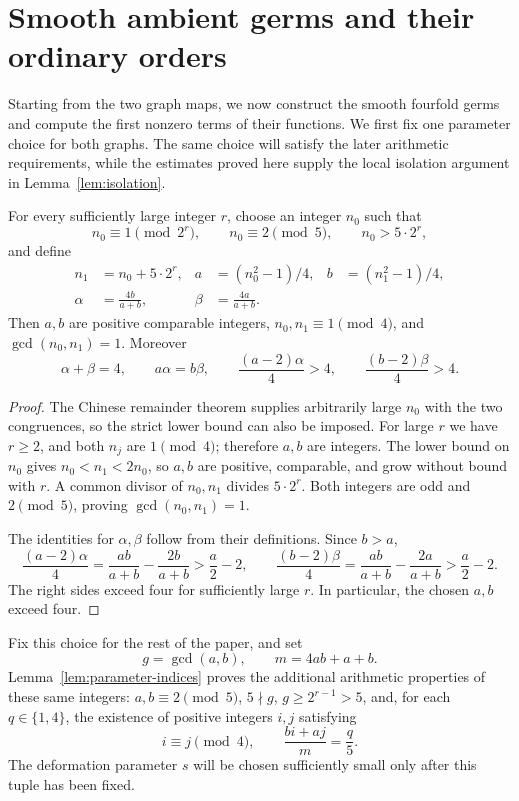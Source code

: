 \section{Smooth ambient germs and their ordinary orders}
\label{sec:ambient-germs}

Starting from the two graph maps, we now construct the smooth fourfold
germs and compute the first nonzero terms of their functions.  We first
fix one parameter choice for both graphs.  The same choice will satisfy
the later arithmetic requirements, while the estimates proved here
supply the local isolation argument in Lemma~\ref{lem:isolation}.

\begin{lemma}\label{lem:simultaneous-parameters}
For every sufficiently large integer \(r\), choose an integer \(n_0\)
such that
\[
 n_0\equiv1\pmod{2^r},\qquad n_0\equiv2\pmod5,\qquad
 n_0>5\cdot2^r,
\]
and define
\begin{align*}
 n_1&=n_0+5\cdot2^r,&
 a&=(n_0^2-1)/4,& b&=(n_1^2-1)/4,\\
 \alpha&=\frac{4b}{a+b},&
 \beta&=\frac{4a}{a+b}.
\end{align*}
Then \(a,b\) are positive comparable integers,
\(n_0,n_1\equiv1\pmod4\), and \(\gcd(n_0,n_1)=1\).
Moreover
\[
 \alpha+\beta=4,\qquad a\alpha=b\beta,\qquad
 \frac{(a-2)\alpha}{4}>4,\qquad
 \frac{(b-2)\beta}{4}>4.
\]
\end{lemma}

\begin{proof}
The Chinese remainder theorem supplies arbitrarily large \(n_0\)
with the two congruences, so the strict lower bound can also be imposed.
For large \(r\) we have \(r\ge2\), and both \(n_j\) are \(1\pmod4\);
therefore \(a,b\) are integers.  The lower bound on \(n_0\) gives
\(n_0<n_1<2n_0\), so \(a,b\) are positive, comparable, and grow
without bound with \(r\).  A common divisor of \(n_0,n_1\) divides
\(5\cdot2^r\).  Both integers are odd and \(2\pmod5\), proving
\(\gcd(n_0,n_1)=1\).

The identities for \(\alpha,\beta\) follow from their definitions.
Since \(b>a\),
\[
 \frac{(a-2)\alpha}{4}
 =\frac{ab}{a+b}-\frac{2b}{a+b}
 >\frac a2-2,\qquad
 \frac{(b-2)\beta}{4}
 =\frac{ab}{a+b}-\frac{2a}{a+b}
 >\frac a2-2.
\]
The right sides exceed four for sufficiently large \(r\).
In particular, the chosen \(a,b\) exceed four.
\end{proof}

Fix this choice for the rest of the paper, and set
\[
 g=\gcd(a,b),\qquad m=4ab+a+b.
\]
Lemma~\ref{lem:parameter-indices} proves the additional arithmetic
properties of these same integers: \(a,b\equiv2\pmod5\),
\(5\nmid g\), \(g\ge2^{r-1}>5\), and, for each \(q\in\{1,4\}\),
the existence of positive integers \(i,j\) satisfying
\[
 i\equiv j\pmod4,\qquad \frac{bi+aj}{m}=\frac q5.
\]
The deformation parameter \(s\) will be chosen sufficiently small only
after this tuple has been fixed.

